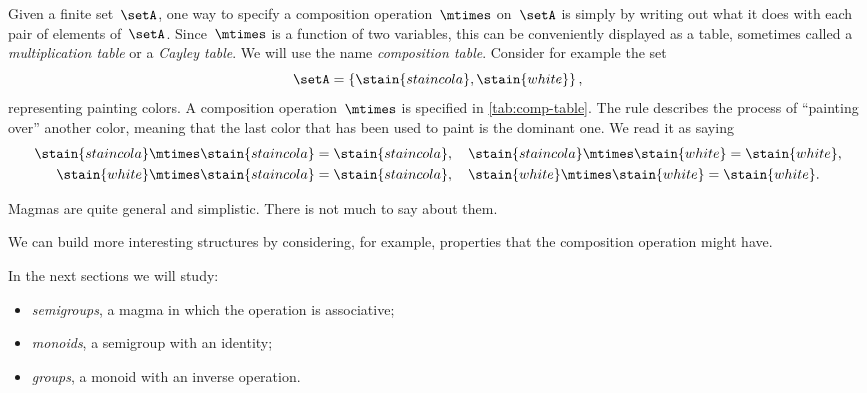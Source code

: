 Given a finite set~$\setA$, one way to specify a composition operation~$\mtimes$ on~$\setA$ is simply by writing out what it does with each pair of elements of~$\setA$.
Since~$\mtimes$ is a function of two variables, this can be conveniently displayed as a table, sometimes called a \emph{multiplication table} or a \emph{Cayley table}.
We will use the name \emph{composition table}.
Consider for example the set
\begin{equation*}
    \setA = \left\{ \stain{staincola}, \stain{white}\right\},
\end{equation*}
representing painting colors.
A composition operation~$\mtimes$ is specified in \cref{tab:comp-table}.
The rule describes the process of ``painting over'' another color, meaning that the last color that has been used to paint is the dominant one.
We read it as saying
\begin{equation*}
    \begin{aligned}
        \stain{staincola} \mtimes \stain{staincola} & = \stain{staincola}, \quad \stain{staincola} \mtimes \stain{white} = \stain{white}, \\
        \stain{white} \mtimes \stain{staincola}     & = \stain{staincola},  \quad \stain{white} \mtimes \stain{white} = \stain{white}.
    \end{aligned}
\end{equation*}

Magmas are quite general and simplistic.
There is not much to say about them.

We can build more interesting structures by considering, for example, properties that the composition operation might have.

In the next sections we will study:

\begin{itemize}
    \item \emph{semigroups}, a magma in which the operation is associative;
    \item \emph{monoids}, a semigroup with an identity;
    \item \emph{groups}, a monoid with an inverse operation.
\end{itemize}